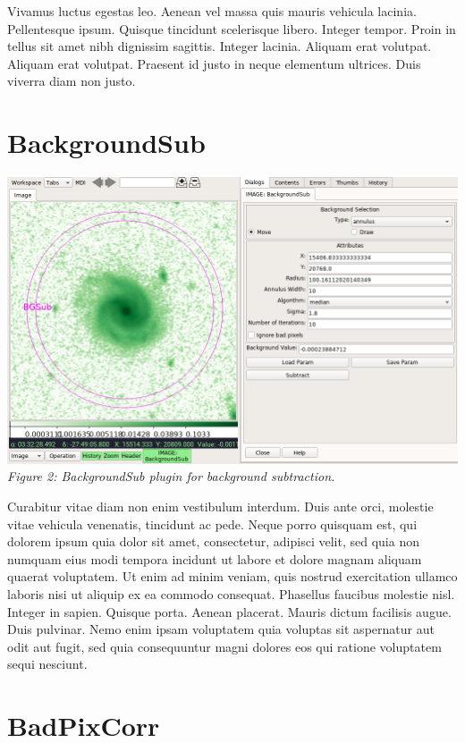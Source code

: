 \documentclass[]{article}
\begin{document}
\begin{multicols}{3}
\para
Vivamus luctus egestas leo. Aenean vel massa quis mauris vehicula
lacinia. Pellentesque ipsum. Quisque tincidunt scelerisque
libero. Integer tempor. Proin in tellus sit amet nibh dignissim
sagittis. Integer lacinia. Aliquam erat volutpat. Aliquam erat
volutpat. Praesent id justo in neque elementum ultrices. Duis viverra
diam non justo.

\section*{BackgroundSub}

\para
\begin{center}
\includegraphics[width=8in]{plugin_backgroundsub} \\
\vspace*{0.4em}
\label{fig:plugin_backgroundsub}
{\small\em Figure 2: BackgroundSub plugin for background subtraction.}
\end{center}

\para
Curabitur vitae diam non enim vestibulum interdum. Duis ante orci,
molestie vitae vehicula venenatis, tincidunt ac pede. Neque porro
quisquam est, qui dolorem ipsum quia dolor sit amet, consectetur,
adipisci velit, sed quia non numquam eius modi tempora incidunt ut
labore et dolore magnam aliquam quaerat voluptatem. Ut enim ad minim
veniam, quis nostrud exercitation ullamco laboris nisi ut aliquip ex ea
commodo consequat. Phasellus faucibus molestie nisl. Integer in
sapien. Quisque porta. Aenean placerat. Mauris dictum facilisis
augue. Duis pulvinar. Nemo enim ipsam voluptatem quia voluptas sit
aspernatur aut odit aut fugit, sed quia consequuntur magni dolores eos
qui ratione voluptatem sequi nesciunt.

\section*{BadPixCorr}


\end{multicols}
\end{document}
